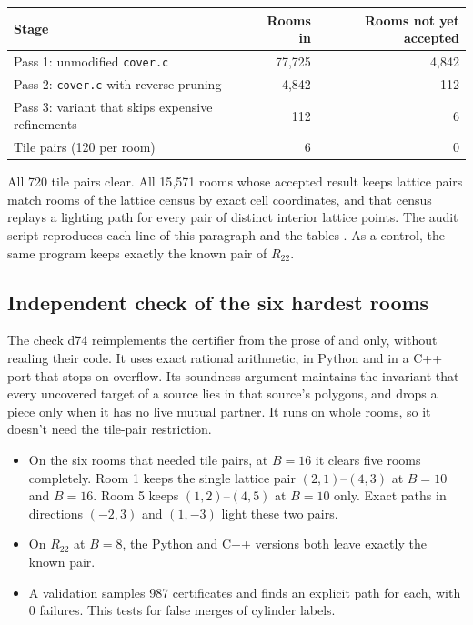 \documentclass[11pt]{article}
\theoremstyle{definition}
\theoremstyle{remark}
\begin{document}
\begin{center}
\begin{tabular}{lrr}
\toprule
Stage & Rooms in & Rooms not yet accepted \\
\midrule
Pass 1: unmodified \texttt{cover.c} & 77{,}725 & 4{,}842 \\
Pass 2: \texttt{cover.c} with reverse pruning & 4{,}842 & 112 \\
Pass 3: variant that skips expensive refinements & 112 & 6 \\
Tile pairs (120 per room) & 6 & 0 \\
\bottomrule
\end{tabular}
\end{center}
All 720 tile pairs clear. All 15{,}571 rooms whose accepted result keeps
lattice pairs match rooms of the lattice census by exact cell coordinates,
and that census replays a lighting path for every pair of distinct
interior lattice points. The audit script reproduces each line of this
paragraph and the tables \cite{offgrid}. As a control, the same program
keeps exactly the known pair of $R_{22}$.

\subsection{Independent check of the six hardest rooms}
The check d74 \cite{d74} reimplements the certifier from the prose of
\cite{d13} and \cite{offgrid} only, without reading their code. It uses
exact rational arithmetic, in Python and in a C++ port that stops on
overflow. Its soundness argument maintains the invariant that every
uncovered target of a source lies in that source's polygons, and drops a
piece only when it has no live mutual partner. It runs on whole rooms, so
it doesn't need the tile-pair restriction.
\begin{itemize}
\item On the six rooms that needed tile pairs, at $B=16$ it clears five
rooms completely. Room 1 keeps the single lattice pair $(2,1)$--$(4,3)$ at
$B=10$ and $B=16$. Room 5 keeps $(1,2)$--$(4,5)$ at $B=10$ only. Exact
paths in directions $(-2,3)$ and $(1,-3)$ light these two pairs.
\item On $R_{22}$ at $B=8$, the Python and C++ versions both leave exactly
the known pair.
\item A validation samples 987 certificates and finds an explicit path for
each, with 0 failures. This tests for false merges of cylinder labels.
\end{itemize}
\end{document}
